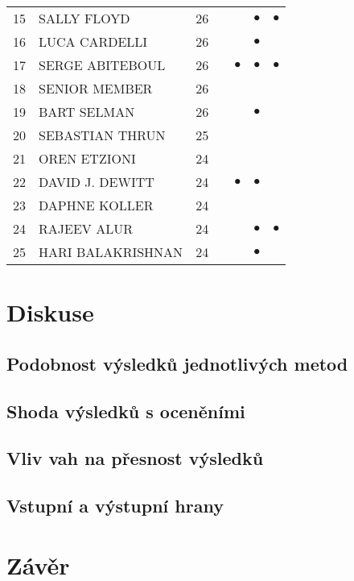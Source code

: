 \documentclass[12pt,titlepage]{report}
\begin{document}
\begin{center}
\begin{tabular}{|l|l|c|c|c|c|c|}
15 & SALLY FLOYD & 26          & &         &$\bullet$&$\bullet$\\
16 & LUCA CARDELLI & 26        & &         &$\bullet$&         \\
17 & SERGE ABITEBOUL & 26      & &$\bullet$&$\bullet$&$\bullet$\\
18 & SENIOR MEMBER & 26        & &         &         &         \\
19 & BART SELMAN & 26          & &         &$\bullet$&         \\
20 & SEBASTIAN THRUN & 25      & &         &         &         \\
21 & OREN ETZIONI & 24         & &         &         &         \\
22 & DAVID J. DEWITT & 24      & &$\bullet$&$\bullet$&         \\
23 & DAPHNE KOLLER & 24        & &         &         &         \\
24 & RAJEEV ALUR & 24          & &         &$\bullet$&$\bullet$\\
25 & HARI BALAKRISHNAN & 24    & &         &$\bullet$&         \\
\hline
\end{tabular}
\end{center}



\chapter{Diskuse}
\section{Podobnost výsledků jednotlivých metod}
\section{Shoda výsledků s oceněními}
\section{Vliv vah na přesnost výsledků}
\section{Vstupní a výstupní hrany}


\chapter{Závěr}



\end{document}
